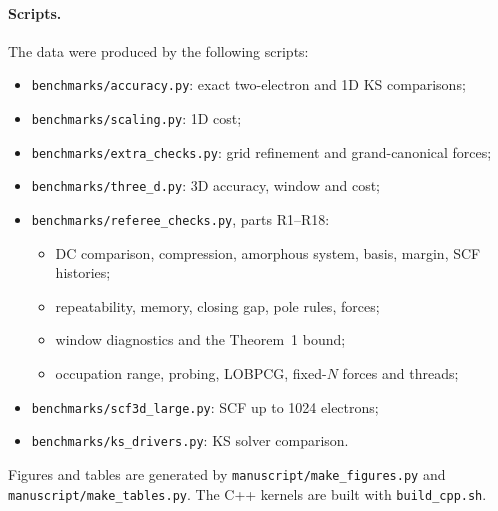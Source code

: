 \documentclass[aps,prb,onecolumn,superscriptaddress,floatfix]{revtex4-2}
\begin{document}
\paragraph*{Scripts.} The data were produced by the following scripts:
\begin{itemize}
\item \texttt{benchmarks/accuracy.py}: exact two-electron and 1D KS comparisons;
\item \texttt{benchmarks/scaling.py}: 1D cost;
\item \texttt{benchmarks/extra\_checks.py}: grid refinement and grand-canonical forces;
\item \texttt{benchmarks/three\_d.py}: 3D accuracy, window and cost;
\item \texttt{benchmarks/referee\_checks.py}, parts R1--R18:
  \begin{itemize}
  \item DC comparison, compression, amorphous system, basis, margin, SCF histories;
  \item repeatability, memory, closing gap, pole rules, forces;
  \item window diagnostics and the Theorem~1 bound;
  \item occupation range, probing, LOBPCG, fixed-$N$ forces and threads;
  \end{itemize}
\item \texttt{benchmarks/scf3d\_large.py}: SCF up to 1024 electrons;
\item \texttt{benchmarks/ks\_drivers.py}: KS solver comparison.
\end{itemize}
Figures and tables are generated by \texttt{manuscript/make\_figures.py} and \texttt{manuscript/make\_tables.py}. The C++
kernels are built with \texttt{build\_cpp.sh}.
\end{document}
